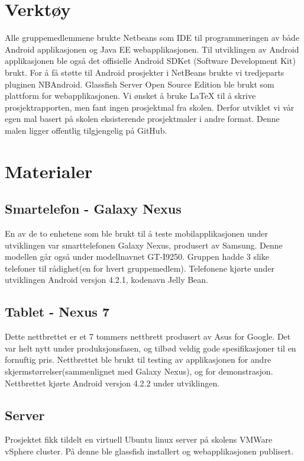 \documentclass[../main.tex]{subfiles}
\begin{document}
\section{Verktøy}
Alle gruppemedlemmene brukte Netbeans som IDE til programmeringen av både Android applikasjonen og Java EE webapplikasjonen. Til utviklingen av Android applikasjonen ble også det offisielle Android SDKet (Software Development Kit) brukt. For å få støtte til Android prosjekter i NetBeans brukte vi tredjeparts pluginen NBAndroid. Glassfish Server Open Source Edition ble brukt som plattform for webapplikasjonen.\newline
\newline
Vi ønsket å bruke LaTeX til å skrive prosjektrapporten, men fant ingen prosjektmal fra skolen. Derfor utviklet vi vår egen mal basert på skolen eksisterende prosjektmaler i andre format. Denne malen ligger offentlig tilgjengelig på GitHub. 

\section{Materialer}
\subsection{Smartelefon - Galaxy Nexus}
En av de to enhetene som ble brukt til å teste mobilapplikasjonen under utviklingen var smarttelefonen Galaxy Nexus, produsert av Samsung. Denne modellen går også under modellnavnet GT-I9250. Gruppen hadde 3 slike telefoner til rådighet(en for hvert gruppemedlem). Telefonene kjørte under utviklingen Android versjon 4.2.1, kodenavn Jelly Bean.
\subsection{Tablet - Nexus 7}
Dette nettbrettet er et 7 tommers nettbrett produsert av Asus for Google. Det var helt nytt under produksjonsfasen, og tilbød veldig gode spesifikasjoner til en fornuftig pris. Nettbrettet ble brukt til testing av applikasjonen for andre skjermstørrelser(sammenlignet med Galaxy Nexus), og for demonstrasjon. Nettbrettet kjørte Android versjon 4.2.2 under utviklingen.

\subsection{Server}
Prosjektet fikk tildelt en virtuell Ubuntu linux server på skolens VMWare vSphere cluster. På denne ble glassfish installert og webapplikasjonen publisert.
\end{document}
